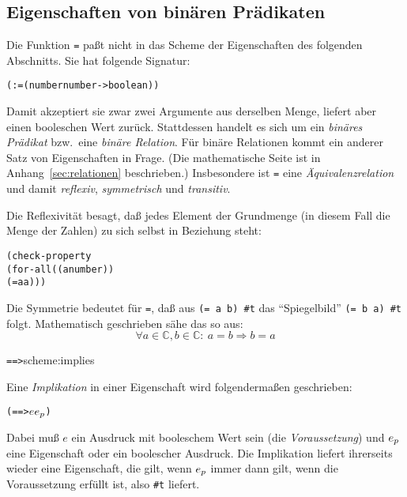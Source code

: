 \subsection{Eigenschaften von binären Prädikaten}

Die Funktion \texttt{=} paßt nicht in das Scheme der Eigenschaften
des folgenden Abschnitts.  Sie hat folgende Signatur:
%
\begin{alltt}
(: = (number number -> boolean))
\end{alltt}
%
Damit akzeptiert sie zwar zwei Argumente aus derselben Menge, liefert
aber einen booleschen Wert zurück.  Stattdessen handelt es sich um ein
\textit{binäres Prädikat} bzw.\ eine \textit{binäre
  Relation}.  Für binäre
Relationen kommt ein anderer Satz von Eigenschaften in Frage.  (Die
mathematische Seite ist in Anhang~\ref{sec:relationen} beschrieben.)
Insbesondere ist \texttt{=} eine
\textit{Äquivalenzrelation} und damit
\textit{reflexiv},
\textit{symmetrisch} und
\textit{transitiv}.

Die Reflexivität besagt, daß jedes Element der Grundmenge (in diesem
Fall die Menge der Zahlen) zu sich selbst in Beziehung steht:
%
\begin{alltt}
(check-property
 (for-all ((a number))
   (= a a)))
\end{alltt}
%
Die Symmetrie bedeutet für \texttt{=}, daß aus \texttt{(= a b)
  \evalsto{} \#t} das "`Spiegelbild"' \texttt{(= b a) \evalsto{} \#t}
folgt.  Mathematisch geschrieben sähe das so aus:
%
\begin{displaymath}
  \forall a \in \mathbb{C}, b\in\mathbb{C}:\ a = b \Rightarrow b = a
\end{displaymath}
%
\begin{feature}{\texttt{==>}}{scheme:implies}

Eine \textit{Implikation} in einer Eigenschaft wird
folgendermaßen geschrieben:
\begin{alltt}
(==> \(e\) \(e\sb{p}\))
\end{alltt}
%
Dabei muß $e$ ein Ausdruck mit booleschem Wert sein (die
\textit{Voraussetzung}) und \(e\sb{p}\) eine Eigenschaft oder ein
boolescher Ausdruck.  Die Implikation liefert ihrerseits wieder eine
Eigenschaft, die gilt, wenn \(e\sb{p}\) immer dann gilt, wenn die
Voraussetzung erfüllt ist, also \verb|#t| liefert.
\end{feature}

